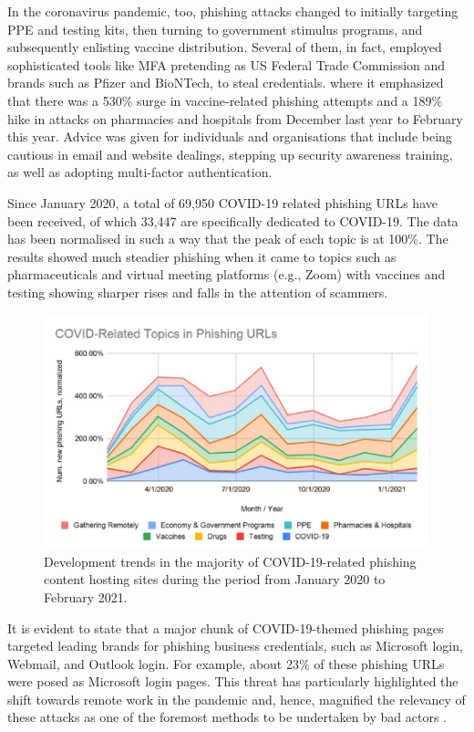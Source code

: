 In the coronavirus pandemic, too, phishing attacks changed to initially targeting PPE and testing kits, then turning to government stimulus programs, and subsequently enlisting vaccine distribution. Several of them, in fact, employed sophisticated tools like MFA pretending as US Federal Trade Commission and brands such as Pfizer and BioNTech, to steal credentials. where it emphasized that there was a 530\% surge in vaccine-related phishing attempts and a 189\% hike in attacks on pharmacies and hospitals from December last year to February this year. Advice was given for individuals and organisations that include being cautious in email and website dealings, stepping up security awareness training, as well as adopting multi-factor authentication.

Since January 2020, a total of 69,950 COVID-19 related phishing URLs have been received, of which 33,447 are specifically dedicated to COVID-19. The data has been normalised in such a way that the peak of each topic is at 100\%. The results showed much steadier phishing when it came to topics such as pharmaceuticals and virtual meeting platforms (e.g., Zoom) with vaccines and testing showing sharper rises and falls in the attention of scammers.

\captionsetup{font= footnotesize}
\begin{figure}[H]
    \centering
    \includegraphics[width=0.8\linewidth]{background/CovidPhising.png}
    \caption{Development trends in the majority of COVID-19-related phishing content hosting sites during the period from January 2020 to February 2021.}
    \label{fig:figFourteen}
\end{figure}

It is evident to state that a major chunk of COVID-19-themed phishing pages targeted leading brands for phishing business credentials, such as Microsoft login, Webmail, and Outlook login. For example, about 23\% of these phishing URLs were posed as Microsoft login pages. This threat has particularly highlighted the shift towards remote work in the pandemic and, hence, magnified the relevancy of these attacks as one of the foremost methods to be undertaken by bad actors .


